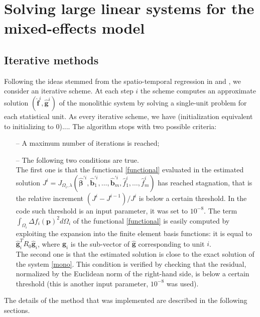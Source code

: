 
\chapter{Solving large linear systems for the mixed-effects model}
\label{ch:chapter_name}
\section{Iterative methods}

Following the ideas stemmed from the spatio-temporal regression in
\citeauthor{pollini} \cite{pollini} and \citeauthor{massardi} \cite{massardi},
we consider an iterative scheme. At each step $i$ the scheme computes an
approximate solution $(\hat{\bm{f}}^{i},\hat{\bm{g}}^{i})$ of the monolithic
system by solving a single-unit problem for each statistical unit. As every
iterative scheme, we have (initialization equivalent to initializing to 0)....
The algorithm stops with two possible criteria:
\begin{itemize}
	\item[--]A maximum number of iterations is reached; \item[--] The following two
		conditions are true. \\ The first one is that the functional \ref{functional}
		evaluated in the estimated solution $J^i = J_{\Omega_i, \lambda}\left(
			\hat{\bm{\beta}}^{\prime i}, \hat{\bm{b}}^{\prime i}_1, \dots,
			\hat{\bm{b}}^{\prime i}_m, \hat{f}_1^i, \dots, \hat{f}_m^i \right)$ has reached
		stagnation, that is the relative increment $\left( J^i - J^{i-1}\right) / J^i$
		is below a certain threshold. In the code such threshold is an input parameter,
		it was set to $10^{-8}$. The term $ \int_{\Omega_i} \Delta f_i
			\left(\bm{p}\right)^2 d\Omega_i $ of the functional \ref{functional} is easily
		computed by exploiting the expansion into the finite element basis functions:
		it is equal to $\hat{\bm{g}}_i^T R_0 \hat{\bm{g}}_i$, where $\hat{\bm{g}}_i $
		is the sub-vector of $\hat{\bm{g}}$ corresponding to unit $i$.\\ The second one
		is that the estimated solution is close to the exact solution of the system
		\ref{mono}. This condition is verified by checking that the residual,
		normalized by the Euclidean norm of the right-hand side, is below a certain
		threshold (this is another input parameter, $10^{-8}$ was used).
\end{itemize}
The details of the method that was implemented are described in the
following sections.

